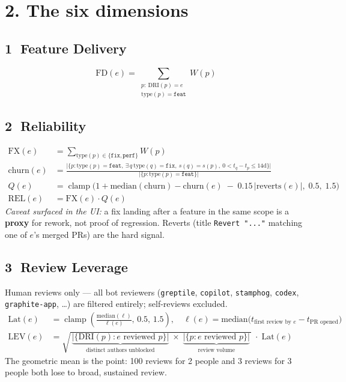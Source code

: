 \documentclass[11pt]{article}
\newcommand{\clampx}{\operatorname{clamp}}
\begin{document}
\section*{2. The six dimensions}

\subsection*{\textcircled{1} Feature Delivery}
\[ \mathrm{FD}(e)=\sum_{\substack{p:\ \mathrm{DRI}(p)=e\\ \mathrm{type}(p)=\texttt{feat}}} W(p) \]

\subsection*{\textcircled{2} Reliability}
\begin{align*}
\mathrm{FX}(e)&=\sum_{\mathrm{type}(p)\in\{\texttt{fix},\texttt{perf}\}} W(p)\\[2pt]
\mathrm{churn}(e)&=\frac{\big|\{p:\mathrm{type}(p)=\texttt{feat},\ \exists\,q\ \mathrm{type}(q)=\texttt{fix},\ s(q)=s(p),\ 0<t_q-t_p\le 14\mathrm{d}\}\big|}{\big|\{p:\mathrm{type}(p)=\texttt{feat}\}\big|}\\[2pt]
Q(e)&=\clampx\!\big(1+\mathrm{median}(\mathrm{churn})-\mathrm{churn}(e)\;-\;0.15\,|\mathrm{reverts}(e)|,\;0.5,\;1.5\big)\\[2pt]
\mathrm{REL}(e)&=\mathrm{FX}(e)\cdot Q(e)
\end{align*}
\emph{Caveat surfaced in the UI:} a fix landing after a feature in the same scope is a \textbf{proxy} for
rework, not proof of regression. Reverts (title \texttt{Revert "..."} matching one of $e$'s merged PRs)
are the hard signal.

\subsection*{\textcircled{3} Review Leverage}
Human reviews only --- all bot reviewers (\texttt{greptile}, \texttt{copilot}, \texttt{stamphog},
\texttt{codex}, \texttt{graphite-app}, \ldots) are filtered entirely; self-reviews excluded.
\begin{align*}
\mathrm{Lat}(e)&=\clampx\!\left(\frac{\mathrm{median}(\ell)}{\ell(e)},\,0.5,\,1.5\right),\quad
\ell(e)=\mathrm{median}\big(t_{\text{first review by }e}-t_{\text{PR opened}}\big)\\[2pt]
\mathrm{LEV}(e)&=\sqrt{\,\underbrace{|\{\mathrm{DRI}(p):e\text{ reviewed }p\}|}_{\text{distinct authors unblocked}}\;\times\;\underbrace{|\{p:e\text{ reviewed }p\}|}_{\text{review volume}}\,}\;\cdot\;\mathrm{Lat}(e)
\end{align*}
The geometric mean is the point: 100 reviews for 2 people and 3 reviews for 3 people both lose to
broad, sustained review.
\end{document}
